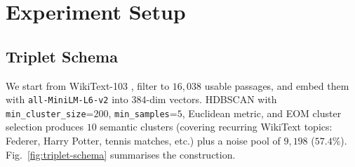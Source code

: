 \documentclass[11pt,a4paper]{article}
\begin{document}
\section{Experiment Setup}
\label{sec:setup}

\subsection{Triplet Schema}
\label{sec:triplets}

We start from WikiText-103 \citep{merity2017pointer}, filter to $16{,}038$ usable passages, and embed them with \texttt{all-MiniLM-L6-v2} \citep{wang2020minilmv2} into $384$-dim vectors. HDBSCAN \citep{campello2013density} with \texttt{min\_cluster\_size}{=}$200$, \texttt{min\_samples}{=}$5$, Euclidean metric, and EOM cluster selection produces $10$ semantic clusters (covering recurring WikiText topics: Federer, Harry Potter, tennis matches, etc.) plus a noise pool of $9{,}198$ ($57.4\%$). Fig.~\ref{fig:triplet-schema} summarises the construction.
\end{document}
